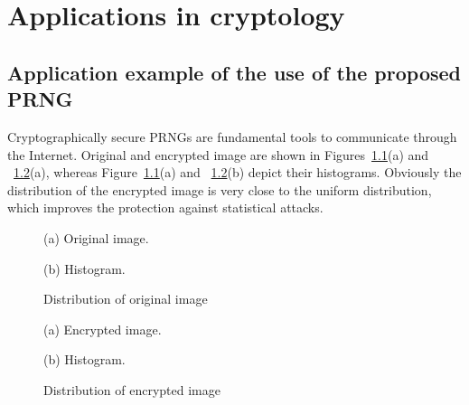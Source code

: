 \chapter{Applications in cryptology}
\label{Application Example}
\minitoc

\section{Application example of the use of the proposed PRNG}
\label{An application example of the proposed PRNG}

Cryptographically secure PRNGs are fundamental tools to communicate through the Internet. 
Original and encrypted image are shown in Figures~\ref{Distribution of original image}(a) and 
~\ref{Distribution of encrypted image}(a), whereas Figure~\ref{Distribution of original image}(a) and ~\ref{Distribution of encrypted image}(b) depict their histograms. 
Obviously the distribution of the encrypted image is very close to the uniform distribution, which improves the protection against statistical attacks.





\begin{figure}
\begin{minipage}[b]{.48\linewidth}
\centering
\centerline{}
\centerline{(a) Original image.}
\end{minipage}
\hfill
\begin{minipage}[b]{0.48\linewidth}
\centering
\centerline{}
\centerline{(b) Histogram.}
\end{minipage}
\caption{Distribution of original image}
\label{Distribution of original image}
\end{figure}

\begin{figure}
\begin{minipage}[b]{.48\linewidth}
\centering
\centerline{}
\centerline{(a) Encrypted image.}
\end{minipage}
\hfill
\begin{minipage}[b]{0.48\linewidth}
\centering
\centerline{}
\centerline{(b) Histogram.}
\end{minipage}
\caption{Distribution of encrypted image}
\label{Distribution of encrypted image}
\end{figure}


